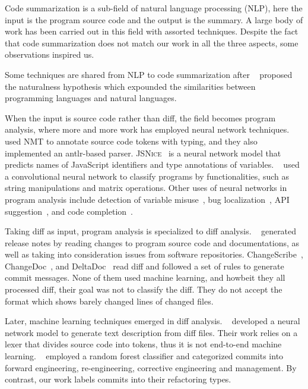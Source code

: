 Code summarization is a sub-field of natural language processing (NLP),
here the input is the program source code and the output is the summary.
A large body of work has been carried out in this field with assorted techniques.
Despite the fact that code summarization does not match our work in all the three aspects,
some observations inspired us.

Some techniques are shared from NLP to code summarization after ~\cite{allamanis2018survey} proposed the naturalness hypothesis which expounded the similarities between programming languages and natural languages.


When the input is source code rather than diff,
the field becomes program analysis, where more and more work has employed neural network techniques.
~\cite{alexandru2017replicating} used NMT to annotate source code tokens with typing,
and they also implemented an {\sc antlr}-based parser.
\textsc{JSNice}~\cite{raychev2015predicting} is a neural network model that predicts names of JavaScript identifiers and type annotations of variables.
~\cite{mou2016convolutional} used a convolutional neural network to classify programs by functionalities, such as string manipulations and matrix operations.
Other uses of neural networks in program analysis include
detection of variable misuse~\cite{morgachev2019detection},
bug localization~\cite{huo2016learning},
API suggestion~\cite{gu2016deep}, and
code completion~\cite{raychev2014code}.

Taking diff as input, program analysis is specialized to diff analysis.
~\cite{moreno2016arena} generated release notes by reading changes to program source code and documentations, as well as taking into consideration issues from software repositories.
ChangeScribe~\cite{linares2015changescribe},
ChangeDoc~\cite{huang2020learning}, and
DeltaDoc~\cite{buse2010automatically} read diff and followed a set of rules to generate commit messages.
None of them used machine learning, and howbeit they all processed diff,
their goal was not to classify the diff.
They do not accept the {\gitdiff} format which shows barely changed lines of changed files.

Later, machine learning techniques emerged in diff analysis.
~\cite{loyola2017neural} developed a neural network model to generate text description from diff files.
Their work relies on a lexer that divides source code into tokens,
thus it is not end-to-end machine learning.
~\cite{macho2016predicting} employed a random forest classifier and categorized commits into forward engineering, re-engineering, corrective engineering and management.
By contrast, our work labels commits into their refactoring types.








